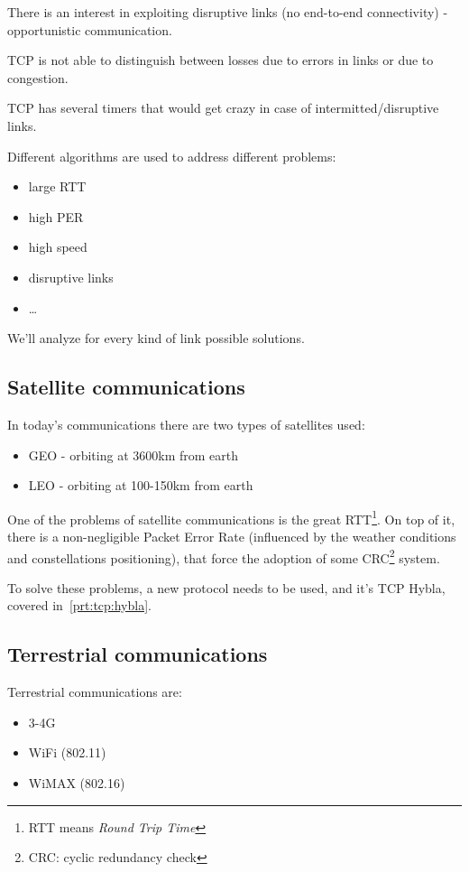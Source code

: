 There is an interest in exploiting disruptive links (no end-to-end
connectivity) - opportunistic communication.

TCP is not able to distinguish between losses due to errors in links or due
to congestion.

TCP has several timers that would get crazy in case of intermitted/disruptive
links.

Different algorithms are used to address different problems:

\begin{itemize}
  \item large RTT
  \item high PER
  \item high speed
  \item disruptive links
  \item \dots
\end{itemize}

We'll analyze for every kind of link possible solutions.

\subsection{Satellite communications}
In today's communications there are two types of satellites used:
\begin{itemize}
\item GEO - orbiting at 3600km from earth
\item LEO - orbiting at 100-150km from earth
\end{itemize}
One of the problems of satellite communications is the great RTT\footnote{RTT
  means \textit{Round Trip Time}}. On top of it, there is a non-negligible
Packet Error Rate (influenced by the weather conditions and constellations
positioning), that force the adoption of some CRC\footnote{CRC: cyclic
redundancy check} system.

To solve these problems, a new protocol needs to be used, and it's TCP Hybla,
covered in~\ref{prt:tcp:hybla}.

\subsection{Terrestrial communications}
Terrestrial communications are:
\begin{itemize}
\item 3-4G
\item WiFi (802.11) 
\item WiMAX (802.16)
\end{itemize}


